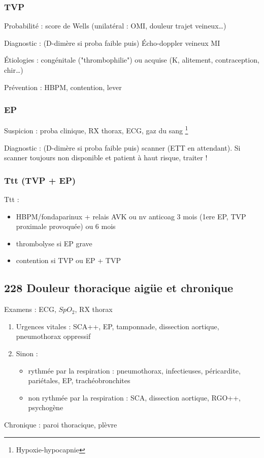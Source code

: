 \documentclass[11pt]{article}
\begin{document}
\subsubsection{TVP}
\label{sec:org4635142}
Probabilité : score de Wells (unilatéral : OMI, douleur trajet veineux\ldots{})

Diagnostic : (D-dimère si proba faible puis) Écho-doppler veineux MI

Étiologies : congénitale ("thrombophilie") ou acquise (K, alitement,
contraception, chir\ldots{})

Prévention : HBPM, contention, lever
\subsubsection{EP}
\label{sec:org9ee7ae2}
Suspicion : proba clinique, RX thorax, ECG, gaz du sang \footnote{Hypoxie-hypocapnie}

Diagnostic : (D-dimère si proba faible puis) scanner (ETT en attendant). Si
scanner toujours non disponible et patient à haut risque, traiter !

\subsubsection{Ttt (TVP + EP)}
\label{sec:orgf3e7957}
Ttt : 
\begin{itemize}
\item HBPM/fondaparinux + relais AVK ou nv anticoag 3 mois (1ere EP, TVP
proximale provoquée) ou 6 mois
\item thrombolyse si EP grave
\item contention si TVP ou EP + TVP
\end{itemize}
\subsection{228 Douleur thoracique aigüe et chronique}
\label{sec:orgc798f6c}
Examens : ECG, \(SpO_2\), RX thorax

\begin{enumerate}
\item Urgences vitales : SCA++, EP, tamponnade, dissection aortique, pneumothorax oppressif
\item Sinon : 
\begin{itemize}
\item rythmée par la respiration : pneumothorax, infectieuses, péricardite,
pariétales, EP, trachéobronchites
\item non rythmée par la respiration : SCA, dissection aortique, RGO++, psychogène
\end{itemize}
\end{enumerate}
Chronique : paroi thoracique, plèvre
\end{document}
